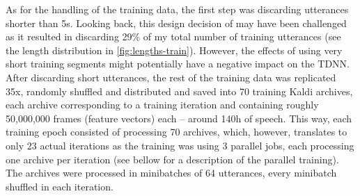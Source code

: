 \documentclass[bsc,frontabs,twoside,singlespacing,parskip,deptreport]{infthesis}
\begin{document}
{{{      %
      As for the handling of the training data, the first step was discarding utterances shorter than 5s. Looking back, this design decision of \citet{Snyder_et_al_2018} may have been challenged as it resulted in discarding 29\% of my total number of training utterances (see the length distribution in \autoref{fig:lengths-train}). However, the effects of using very short training segments might potentially have a negative impact on the TDNN. After discarding short utterances, the rest of the training data was replicated 35x, randomly shuffled and distributed and saved into 70 training Kaldi archives, each archive corresponding to a training iteration and containing roughly 50,000,000 frames (feature vectors) each -- around 140h of speech. This way, each training epoch consisted of processing 70 archives, which, however, translates to only 23 actual iterations as the training was using 3 parallel jobs, each processing one archive per iteration (see bellow for a description of the parallel training). The archives were processed in minibatches of 64 utterances, every minibatch shuffled in each iteration.

}}}
\end{document}
